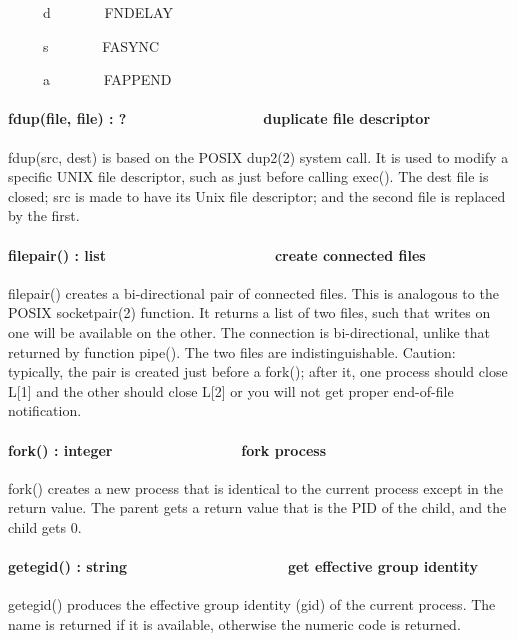\ \ \ \ \ d \ \ \ \ \ \ \ FNDELAY 

\ \ \ \ \ s \ \ \ \ \ \ \ FASYNC 

\ \ \ \ \ a \ \ \ \ \ \ \ FAPPEND 

\paragraph[fdup(file, file) : ?\ \ \ \ \ \ \ \ \ \ \ \ 
\ \ \ \ \ duplicate file descriptor]{fdup(file, file) :
?\ \ \ \ \ \ \ \ \ \ \ \  \ \ \ \ \ duplicate file descriptor}
fdup(src, dest) is based on the POSIX dup2(2) system call. It is used to
modify a specific UNIX file descriptor, such as just before calling
exec(). The dest file is closed; src is made to have its Unix file
descriptor; and the second file is replaced by the first. 

\paragraph[filepair() : list\ \ \ \ \ \ \ \ \ \ \ \ \ \ 
\ \ \ \ \ \ \ create connected files]{filepair() :
list\ \ \ \ \ \ \ \ \ \ \ \ \ \  \ \ \ \ \ \ \ create connected files}
filepair() creates a bi-directional pair of connected files. This is
analogous to the POSIX socketpair(2) function. It returns a list of two
files, such that writes on one will be available on the other. The
connection is bi-directional, unlike that returned by function pipe().
The two files are indistinguishable. Caution: typically, the pair is
created just before a fork(); after it, one process should close L[1]
and the other should close L[2] or you will not get proper end-of-file
notification. 

\paragraph[fork() : integer\ \ \ \ \ \ \ \ \ \ \ \ \ \ \ \  fork
process]{fork() : integer\ \ \ \ \ \ \ \ \ \ \ \ \ \ \ \  fork process}
fork() creates a new process that is identical to the current process
except in the return value. The parent gets a return value that is the
PID of the child, and the child gets 0.

\paragraph[getegid() : string\ \ \ \ \ \ \ \ \ \ 
\ \ \ \ \ \ \ \ \ \ get effective group identity]{getegid() :
string\ \ \ \ \ \ \ \ \ \  \ \ \ \ \ \ \ \ \ \ get effective group
identity}
getegid() produces the effective group identity (gid) of the current
process. The name is returned if it is available, otherwise the numeric
code is returned.

